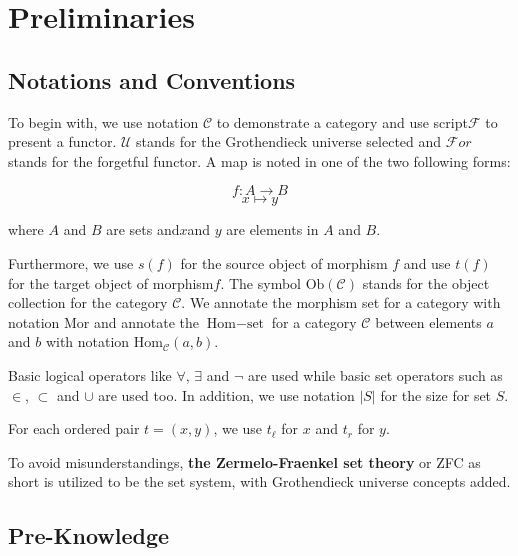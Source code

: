 \documentclass{aims}
\numberwithin{equation}{section}
\numberwithin{theorem}{section}	%
\numberwithin{axiom}{section}	%
\numberwithin{definition}{section}	%
\begin{document}
	\section{Preliminaries}
	
	\subsection{Notations and Conventions}
	
	To begin with, we use notation \(\mathcal{C}\) to demonstrate a category and use script\(\mathcal{F}\) to present a functor. \(\mathcal{U}\) stands for the Grothendieck universe selected and \(\mathcal{F}\mathit{o}\mathit{r}\) stands for the forgetful functor. A map is noted in one of the two following forms:
	
	\begin{equation*}
		f: A \to B
	\end{equation*}
	\begin{equation*}
		x\mapsto y
	\end{equation*}
	
	\noindent where \(A\) and \(B\) are sets and\(x\)and \(y\) are elements in \(A\) and \(B\).
	
	Furthermore, we use \(s(f)\) for the source object of morphism \(f\)\textit{  }and use \(t(f)\) for the target object of morphism\(f\). The symbol \(\text{Ob}(\mathcal{C})\) stands for the object collection for the category \(\mathcal{C}\). We annotate the morphism set for a category with notation \(\text{Mor}\) and annotate the \(\text{Hom}-\text{set}\) for a category \(\mathcal{C}\) between elements \(a\) and \(b\) with notation \(\text{Hom}_{\mathcal{C}}(a,b)\).
	
	Basic logical operators like \(\forall\), \(\exists\) and \(\neg\) are used while basic set operators such as \(\in\), \(\subset\) and \(\cup\) are used too. In addition, we use notation \(|S|\) for the size for set \(S\).
	
	For each ordered pair \(t=(x,y)\), we use \(t_{\ell }\) for \(x\) and \(t_{\mathit{r}}\) for \(y\).
	
	To avoid misunderstandings, \textbf{the Zermelo-Fraenkel set theory} or ZFC as short is utilized to be the set system, with Grothendieck universe concepts added. \cite{Li2019}
	
	\subsection{Pre-Knowledge}
	
\end{document}

